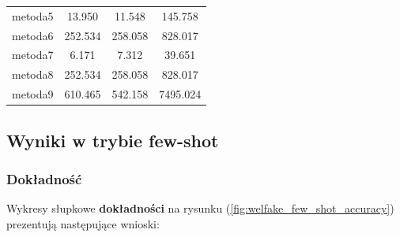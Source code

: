 \begin{table}[H]
\begin{tabular}{lccc}
		metoda5           & 13.950        & 11.548           & 145.758        \\
		metoda6           & 252.534       & 258.058          & 828.017        \\
		metoda7           & 6.171         & 7.312            & 39.651         \\
		metoda8           & 252.534       & 258.058          & 828.017        \\
		metoda9           & 610.465       & 542.158          & 7495.024       \\
		\bottomrule
	\end{tabular}
\end{table}

\subsection{Wyniki w trybie few-shot}
\subsubsection{Dokładność}
Wykresy słupkowe \textbf{dokładności} na rysunku (\ref{fig:welfake_few_shot_accuracy}) prezentują następujące wnioski:

